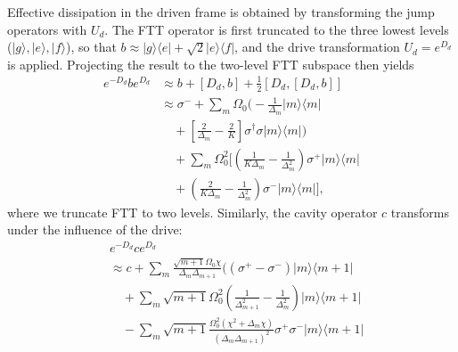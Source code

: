 Effective dissipation in the driven frame is obtained by transforming the jump operators with $U_d$. The FTT operator is first truncated to the three lowest levels ($|g\rangle, |e\rangle, |f\rangle$), so that $b \approx |g\rangle\langle e| + \sqrt{2}|e\rangle\langle f|$, and the drive transformation $U_d=e^{D_d}$ is applied. Projecting the result to the two-level FTT subspace then yields
\begin{align}
\label{transformb}
    e^{-D_d} b e^{D_d} &\approx b + [D_d,b] +\frac{1}{2}[D_d,[D_d,b]] \nonumber \\
    &\approx \sigma^- + \sum_m \Omega_0 \bigg( -\frac{1}{\Delta_m} |m\rangle\langle m| \nonumber \\
    &\quad + \left[ \frac{2}{\Delta_m} - \frac{2}{K} \right] \sigma^\dagger \sigma |m\rangle\langle m| \bigg) \nonumber \\
    &\quad + \sum_m \Omega_0^2 \bigg[ \left( \frac{1}{K \Delta_m} - \frac{1}{\Delta_m^2} \right) \sigma^+ |m\rangle\langle m| \nonumber \\
    &\quad + \left( \frac{2}{K \Delta_m} - \frac{1}{\Delta_m^2} \right) \sigma^- |m\rangle\langle m| \bigg],
\end{align}
where we truncate FTT to two levels.
Similarly, the cavity operator $c$ transforms under the influence of the drive:
\begin{align}
\label{transformc}
    &e^{-D_d} c e^{D_d}\nonumber \\
    &\approx c + \sum_m \frac{\sqrt{m+1} \Omega_0 \chi}{\Delta_{ m} \Delta_{ m+1}} \big( (\sigma^+ - \sigma^-)|m\rangle\langle m+1|    \nonumber \\
    &\quad + \sum_m \sqrt{m+1} \Omega_0^2 \left( \frac{1}{\Delta_{ m+1}^2} - \frac{1}{\Delta_{ m}^2} \right) |m\rangle\langle m+1| \nonumber \\
    &\quad - \sum_m \sqrt{m+1} \frac{\Omega_0^2 (\chi^2 + \Delta_{m} \chi)}{(\Delta_{m} \Delta_{ m+1})^2} \sigma^+ \sigma^- |m\rangle\langle m+1|
\end{align}


